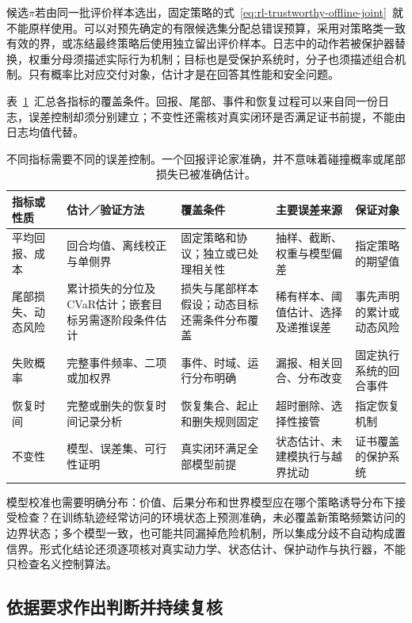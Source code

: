 候选$\pi$若由同一批评价样本选出，固定策略的式~\eqref{eq:rl-trustworthy-offline-joint}~就不能原样使用。可以对预先确定的有限候选集分配总错误预算，采用对策略类一致有效的界，或冻结最终策略后使用独立留出评价样本。日志中的动作若被保护器替换，权重分母须描述实际行为机制；目标也是受保护系统时，分子也须描述组合机制。只有概率比对应交付对象，估计才是在回答其性能和安全问题。

表~\ref{tab:rl-trustworthy-indicators}~汇总各指标的覆盖条件。回报、尾部、事件和恢复过程可以来自同一份日志，误差控制却须分别建立；不变性还需核对真实闭环是否满足证书前提，不能由日志均值代替。

\begin{table}[t]
  \centering
  \begin{tabularx}{\linewidth}{@{}>{\raggedright\arraybackslash}p{19mm}XXXX@{}}
    \toprule
    指标或性质 & 估计／验证方法 & 覆盖条件 & 主要误差来源 & 保证对象 \\
    \midrule
    平均回报、成本 & 回合均值、离线校正与单侧界 & 固定策略和协议；独立或已处理相关性 & 抽样、截断、权重与模型偏差 & 指定策略的期望值 \\
    尾部损失、动态风险 & 累计损失的分位及CVaR估计；嵌套目标另需逐阶段条件估计 & 损失与尾部样本假设；动态目标还需条件分布覆盖 & 稀有样本、阈值估计、选择及递推误差 & 事先声明的累计或动态风险 \\
    失败概率 & 完整事件频率、二项或加权界 & 事件、时域、运行分布明确 & 漏报、相关回合、分布改变 & 固定执行系统的回合事件 \\
    恢复时间 & 完整或删失的恢复时间记录分析 & 恢复集合、起止和删失规则固定 & 超时删除、选择性接管 & 指定恢复机制 \\
    不变性 & 模型、误差集、可行性证明 & 真实闭环满足全部模型前提 & 状态估计、未建模执行与越界扰动 & 证书覆盖的保护系统 \\
    \bottomrule
  \end{tabularx}
  \caption{不同指标需要不同的误差控制。一个回报评论家准确，并不意味着碰撞概率或尾部损失已被准确估计。}
  \label{tab:rl-trustworthy-indicators}
\end{table}

模型校准也需要明确分布：价值、后果分布和世界模型应在哪个策略诱导分布下接受检查？在训练轨迹经常访问的环境状态上预测准确，未必覆盖新策略频繁访问的边界状态；多个模型一致，也可能共同漏掉危险机制，所以集成分歧不自动构成置信界。形式化结论还须逐项核对真实动力学、状态估计、保护动作与执行器，不能只检查名义控制算法。

\subsection{依据要求作出判断并持续复核}
\label{sec:rl-trustworthy-decision}


